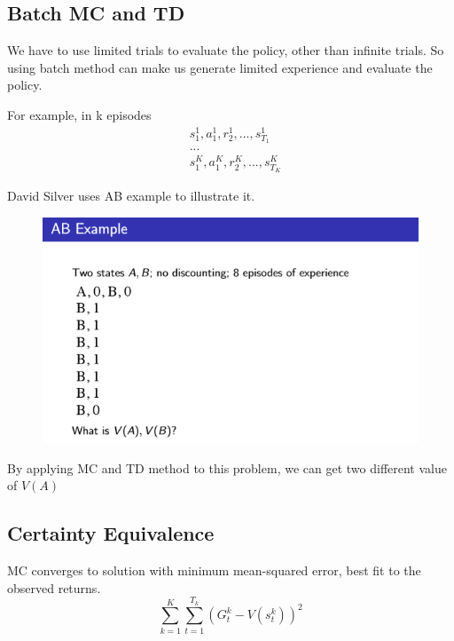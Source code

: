 \documentclass[12pt, a4paper]{paper}
\begin{document}
\subsection{Batch MC and TD}

We have to use limited trials to evaluate the policy, other than infinite trials.
So using batch method can make us generate limited experience and evaluate the policy.

For example, in k episodes
\begin{equation*}
	\begin{aligned}
		&s_{1}^{1}, a_{1}^{1}, r_{2}^{1}, ..., s_{T_{1}}^{1} \\ 
		&...\\
		&s_{1}^{K}, a_{1}^{K}, r_{2}^{K}, ..., s_{T_{K}}^{K}	
	\end{aligned}
\end{equation*}

David Silver uses AB example to illustrate it.
\begin{figure}[h]
	\begin{center}
		\includegraphics[width=\linewidth]{AB.png}
	\end{center}
\end{figure}

By applying MC and TD method to this problem, we can get two different value of $V(A)$

\subsection{Certainty Equivalence}
MC converges to solution with minimum mean-squared error, best fit to the observed
returns.
\begin{equation*}
	\sum_{k=1}^{K} \sum_{t=1}^{T_{k}} (G_{t}^{k} - V(s_{t}^{k}))^2
\end{equation*}
\end{document}
